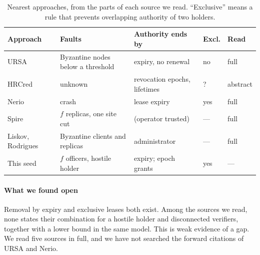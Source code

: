 \begin{table}[t]
\caption{Nearest approaches, from the parts of each source we read. ``Exclusive'' means a
rule that prevents overlapping authority of two holders.}
\label{tab:positioning}
\centering
\footnotesize
\begin{tabularx}{\columnwidth}{@{}>{\raggedright\arraybackslash}p{}>{\raggedright\arraybackslash}X>{\raggedright\arraybackslash}p{}ll@{}}
\toprule
Approach & Faults & Authority ends by & Excl. & Read \\
\midrule
URSA~\cite{luo2004ursa} & Byzantine nodes below a threshold & expiry, no renewal & no & full \\
HRCred~\cite{zhou2026hrcred} & unknown & revocation epochs, lifetimes & ? & abstract \\
Nerio~\cite{vanrenesse2011nerio} & crash & lease expiry & yes & full \\
Spire~\cite{babay2018spire} & $f$ replicas, one site cut & (operator trusted) & --- & full \\
Liskov, Rodrigues~\cite{liskov2005tr} & Byzantine clients and replicas & administrator & --- & full \\
This seed & $f$ officers, hostile holder & expiry; epoch grants & yes & --- \\
\bottomrule
\end{tabularx}
\end{table}

\paragraph{What we found open}
Removal by expiry and exclusive leases both exist. Among the sources we read, none states
their combination for a hostile holder and disconnected verifiers, together with a lower
bound in the same model. This is weak evidence of a gap. We read five sources in full, and
we have not searched the forward citations of URSA and Nerio.
